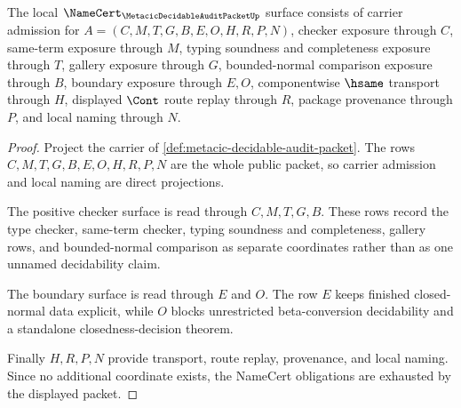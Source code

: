 
\begin{theorem}
\label{thm:metacic-decidable-audit-packet-namecert-obligations}
The local $\NameCert_{\MetacicDecidableAuditPacketUp}$ surface consists of carrier admission for $A=(C,M,T,G,B,E,O,H,R,P,N)$, checker exposure through $C$, same-term exposure through $M$, typing soundness and completeness exposure through $T$, gallery exposure through $G$, bounded-normal comparison exposure through $B$, boundary exposure through $E,O$, componentwise $\hsame$ transport through $H$, displayed $\Cont$ route replay through $R$, package provenance through $P$, and local naming through $N$.
\end{theorem}
\begin{proof}
Project the carrier of \autoref{def:metacic-decidable-audit-packet}. The rows $C,M,T,G,B,E,O,H,R,P,N$ are the whole public packet, so carrier admission and local naming are direct projections.

The positive checker surface is read through $C,M,T,G,B$. These rows record the type checker, same-term checker, typing soundness and completeness, gallery rows, and bounded-normal comparison as separate coordinates rather than as one unnamed decidability claim.

The boundary surface is read through $E$ and $O$. The row $E$ keeps finished closed-normal data explicit, while $O$ blocks unrestricted beta-conversion decidability and a standalone closedness-decision theorem.

Finally $H,R,P,N$ provide transport, route replay, provenance, and local naming. Since no additional coordinate exists, the NameCert obligations are exhausted by the displayed packet.
\end{proof}

